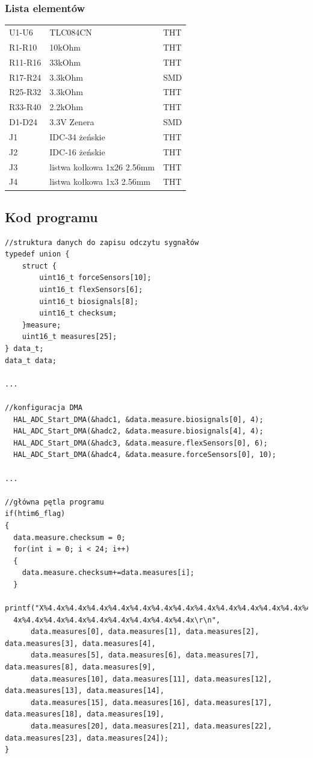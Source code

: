 \documentclass{article}
\begin{document}
\subsubsection{Lista elementów}
\begin{table}[H]
	\centering
	\label{Bill of materials}
\begin{tabular}{lll}
U1-U6		&	TLC084CN			&	THT	\\
R1-R10		&	10kOhm				&	THT	\\
R11-R16		&	33kOhm				&	THT	\\
R17-R24		&	3.3kOhm				&	SMD	\\
R25-R32		&	3.3kOhm				&	THT	\\
R33-R40		&	2.2kOhm				&	THT	\\
D1-D24		&	3.3V Zenera			&	SMD	\\
J1		&	IDC-34 żeńskie			&	THT	\\
J2		&	IDC-16 żeńskie			&	THT	\\
J3		&	listwa kołkowa 1x26 2.56mm	&	THT	\\
J4		&	listwa kołkowa 1x3 2.56mm	&	THT	\\
\end{tabular}
\end{table}



\subsection{Kod programu}
\begin{verbatim}
//struktura danych do zapisu odczytu sygnałów
typedef union {
	struct {
		uint16_t forceSensors[10];
		uint16_t flexSensors[6];
		uint16_t biosignals[8];
		uint16_t checksum;
	}measure;
	uint16_t measures[25];
} data_t;
data_t data;

...

//konfiguracja DMA
  HAL_ADC_Start_DMA(&hadc1, &data.measure.biosignals[0], 4);
  HAL_ADC_Start_DMA(&hadc2, &data.measure.biosignals[4], 4);
  HAL_ADC_Start_DMA(&hadc3, &data.measure.flexSensors[0], 6);
  HAL_ADC_Start_DMA(&hadc4, &data.measure.forceSensors[0], 10);

...

//główna pętla programu
if(htim6_flag)
{
  data.measure.checksum = 0;
  for(int i = 0; i < 24; i++)
  {
    data.measure.checksum+=data.measures[i];
  }
  printf("X%4.4x%4.4x%4.4x%4.4x%4.4x%4.4x%4.4x%4.4x%4.4x%4.4x%4.4x%4.4x%4.4x%4.4x%4.4x%4.4x%4.
  4x%4.4x%4.4x%4.4x%4.4x%4.4x%4.4x%4.4x%4.4x\r\n",
	  data.measures[0], data.measures[1], data.measures[2], data.measures[3], data.measures[4],
	  data.measures[5], data.measures[6], data.measures[7], data.measures[8], data.measures[9],
	  data.measures[10], data.measures[11], data.measures[12], data.measures[13], data.measures[14],
	  data.measures[15], data.measures[16], data.measures[17], data.measures[18], data.measures[19],
	  data.measures[20], data.measures[21], data.measures[22], data.measures[23], data.measures[24]);
}
\end{verbatim}
\end{document}
